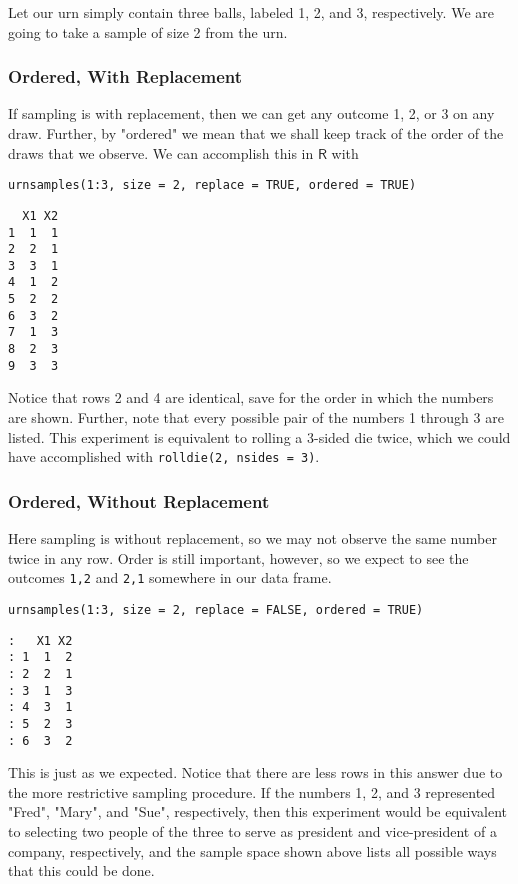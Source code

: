 \label{exa-sample-urn-two-from-three} Let our urn simply contain three
balls, labeled 1, 2, and 3, respectively. We are going to take a
sample of size 2 from the urn.

\subsubsection{Ordered, With Replacement}
\label{sec-4-1-2-2}

If sampling is with replacement, then we can get any outcome 1, 2, or
3 on any draw. Further, by "ordered" we mean that we shall keep
track of the order of the draws that we observe. We can accomplish
this in \(\mathsf{R}\) with

\begin{verbatim}
urnsamples(1:3, size = 2, replace = TRUE, ordered = TRUE)
\end{verbatim}

\begin{verbatim}
  X1 X2
1  1  1
2  2  1
3  3  1
4  1  2
5  2  2
6  3  2
7  1  3
8  2  3
9  3  3
\end{verbatim}

Notice that rows 2 and 4 are identical, save for the order in which
the numbers are shown. Further, note that every possible pair of the
numbers 1 through 3 are listed. This experiment is equivalent to
rolling a 3-sided die twice, which we could have accomplished with
\texttt{rolldie(2, nsides = 3)}.

\subsubsection{Ordered, Without Replacement}
\label{sec-4-1-2-3}

Here sampling is without replacement, so we may not observe the same
number twice in any row. Order is still important, however, so we
expect to see the outcomes \texttt{1,2} and \texttt{2,1} somewhere in our data
frame.

\begin{verbatim}
urnsamples(1:3, size = 2, replace = FALSE, ordered = TRUE)
\end{verbatim}

\begin{verbatim}
:   X1 X2
: 1  1  2
: 2  2  1
: 3  1  3
: 4  3  1
: 5  2  3
: 6  3  2
\end{verbatim}

This is just as we expected. Notice that there are less rows in this
answer due to the more restrictive sampling procedure. If the numbers
1, 2, and 3 represented "Fred", "Mary", and "Sue", respectively,
then this experiment would be equivalent to selecting two people of
the three to serve as president and vice-president of a company,
respectively, and the sample space shown above lists all possible ways
that this could be done.

